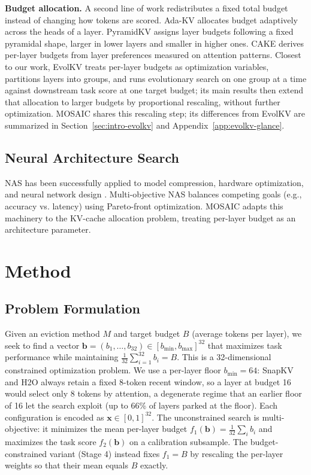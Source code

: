 \documentclass[11pt]{article}
\begin{document}
\textbf{Budget allocation.} A second line of work redistributes a fixed total budget instead of changing how tokens are scored. Ada-KV \citep{feng2025adakv} allocates budget adaptively across the heads of a layer. PyramidKV \citep{cai2025pyramidkv} assigns layer budgets following a fixed pyramidal shape, larger in lower layers and smaller in higher ones. CAKE \citep{qin2025cake} derives per-layer budgets from layer preferences measured on attention patterns. Closest to our work, EvolKV \citep{yu2025evolkv} treats per-layer budgets as optimization variables, partitions layers into groups, and runs evolutionary search on one group at a time against downstream task score at one target budget; its main results then extend that allocation to larger budgets by proportional rescaling, without further optimization. MOSAIC shares this rescaling step; its differences from EvolKV are summarized in Section~\ref{sec:intro-evolkv} and Appendix~\ref{app:evolkv-glance}.

\subsection{Neural Architecture Search}

NAS has been successfully applied to model compression, hardware optimization, and neural network design \citep{elsken2018neural}. Multi-objective NAS balances competing goals (e.g., accuracy vs. latency) using Pareto-front optimization. MOSAIC adapts this machinery to the KV-cache allocation problem, treating per-layer budget as an architecture parameter.

\section{Method}

\subsection{Problem Formulation}

Given an eviction method $M$ and target budget $B$ (average tokens per layer), we seek to find a vector $\mathbf{b} = (b_1, \ldots, b_{32}) \in [b_{\min}, b_{\max}]^{32}$ that maximizes task performance while maintaining $\frac{1}{32}\sum_{i=1}^{32} b_i = B$. This is a 32-dimensional constrained optimization problem. We use a per-layer floor $b_{\min} = 64$: SnapKV and H2O always retain a fixed 8-token recent window, so a layer at budget 16 would select only 8 tokens by attention, a degenerate regime that an earlier floor of 16 let the search exploit (up to 66\% of layers parked at the floor). Each configuration is encoded as $\mathbf{x} \in [0,1]^{32}$. The unconstrained search is multi-objective: it minimizes the mean per-layer budget $f_1(\mathbf{b}) = \frac{1}{32}\sum_i b_i$ and maximizes the task score $f_2(\mathbf{b})$ on a calibration subsample. The budget-constrained variant (Stage 4) instead fixes $f_1 = B$ by rescaling the per-layer weights so that their mean equals $B$ exactly.
\end{document}

